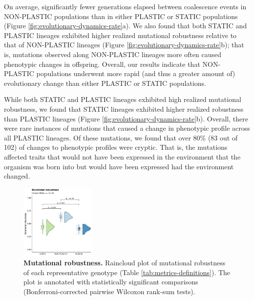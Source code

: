 \begin{raggedbottom}
On average, significantly fewer generations elapsed between coalescence events in NON-PLASTIC populations than in either PLASTIC or STATIC populations (Figure \ref{fig:evolutionary-dynamics-rate}a).
We also found that both STATIC and PLASTIC lineages exhibited higher realized mutational robustness relative to that of NON-PLASTIC lineages (Figure \ref{fig:evolutionary-dynamics-rate}b); that is, mutations observed along NON-PLASTIC lineages more often caused phenotypic changes in offspring.
Overall, our results indicate that NON-PLASTIC populations underwent more rapid (and thus a greater amount of) evolutionary change than either PLASTIC or STATIC populations.

While both STATIC and PLASTIC lineages exhibited high realized mutational robustness, we found that STATIC lineages exhibited higher realized robustness than PLASTIC lineages (Figure \ref{fig:evolutionary-dynamics-rate}b).
Overall, there were rare instances of mutations that caused a change in phenotypic profile across all PLASTIC lineages.
Of these mutations, we found that over 80\% (83 out of 102) of changes to phenotypic profiles were cryptic.
That is, the mutations affected traits that would not have been expressed in the environment that the organism was born into but would have been expressed had the environment changed.

\begin{figure}[ht!]
  \centering
  \includegraphics[width=0.33\textwidth]{05_consequences_of_plasticity/media/media-mutational-robustness.pdf}
  \caption{\small
      \textbf{Mutational robustness.}
      Raincloud plot of mutational robustness of each representative genotype (Table \ref{tab:metrics-definitions}).
      The plot is annotated with statistically significant comparisons (Bonferroni-corrected pairwise Wilcoxon rank-sum tests).
  }
  \label{fig:mutational-robustness}
\end{figure}


\end{raggedbottom}
